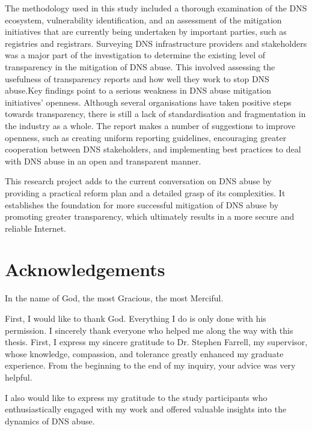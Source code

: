 \documentclass[a4paper,oneside,12pt]{book}
\numberwithin{equation}{chapter} %
\begin{document}
The methodology used in this study included a thorough examination of the DNS ecosystem, vulnerability identification, and an assessment of the mitigation initiatives that are currently being undertaken by important parties, such as registries and registrars. Surveying DNS infrastructure providers and stakeholders was a major part of the investigation to determine the existing level of transparency in the mitigation of DNS abuse. This involved assessing the usefulness of transparency reports and how well they work to stop DNS abuse.Key findings point to a serious weakness in DNS abuse mitigation initiatives' openness. Although several organisations have taken positive steps towards transparency, there is still a lack of standardisation and fragmentation in the industry as a whole. The report makes a number of suggestions to improve openness, such as creating uniform reporting guidelines, encouraging greater cooperation between DNS stakeholders, and implementing best practices to deal with DNS abuse in an open and transparent manner.

This research project adds to the current conversation on DNS abuse by providing a practical reform plan and a detailed grasp of its complexities. It establishes the foundation for more successful mitigation of DNS abuse by promoting greater transparency, which ultimately results in a more secure and reliable Internet.




\newpage
\onehalfspacing\raggedright %

\section*{\Huge\textcolor{tcd_blue}{Acknowledgements}}

In the name of God, the most Gracious, the most Merciful.

First, I would like to thank God. Everything I do is only done with his permission. I sincerely thank everyone who helped me along the way with this thesis. First, I express my sincere gratitude to Dr. Stephen Farrell, my supervisor, whose knowledge, compassion, and tolerance greatly enhanced my graduate experience. From the beginning to the end of my inquiry, your advice was very helpful.

I also would like to express my gratitude to the study participants who enthusiastically engaged with my work and offered valuable insights into the dynamics of DNS abuse.
\end{document}
